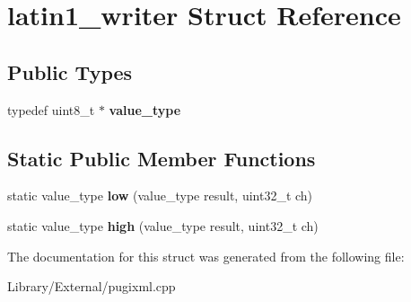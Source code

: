 \hypertarget{structlatin1__writer}{}\section{latin1\+\_\+writer Struct Reference}
\label{structlatin1__writer}
\subsection*{Public Types}
\begin{DoxyCompactItemize}
\item 
\hypertarget{structlatin1__writer_af9228600fa7eecd793cc3d927d46eb1a}{}typedef uint8\+\_\+t $\ast$ {\bfseries value\+\_\+type}\label{structlatin1__writer_af9228600fa7eecd793cc3d927d46eb1a}

\end{DoxyCompactItemize}
\subsection*{Static Public Member Functions}
\begin{DoxyCompactItemize}
\item 
\hypertarget{structlatin1__writer_ab5d7a833d29d66031420686ca67b1f6e}{}static value\+\_\+type {\bfseries low} (value\+\_\+type result, uint32\+\_\+t ch)\label{structlatin1__writer_ab5d7a833d29d66031420686ca67b1f6e}

\item 
\hypertarget{structlatin1__writer_a0e48c306ebe556f267404a9624f00554}{}static value\+\_\+type {\bfseries high} (value\+\_\+type result, uint32\+\_\+t ch)\label{structlatin1__writer_a0e48c306ebe556f267404a9624f00554}

\end{DoxyCompactItemize}


The documentation for this struct was generated from the following file\+:\begin{DoxyCompactItemize}
\item 
Library/\+External/pugixml.\+cpp\end{DoxyCompactItemize}
